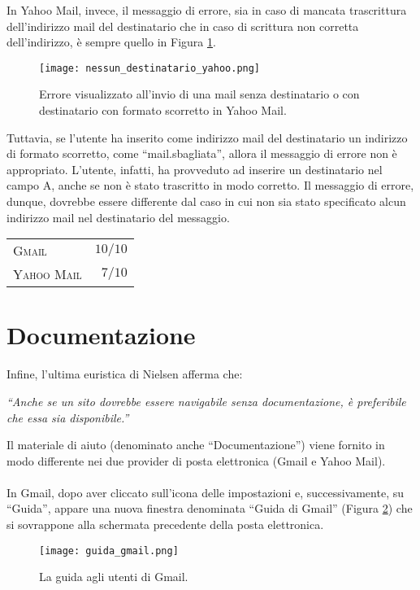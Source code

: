 		In Yahoo Mail, invece, il messaggio di errore, sia in caso di mancata trascrittura dell'indirizzo mail del destinatario che in caso di scrittura non corretta dell'indirizzo, è sempre quello in Figura \ref{fig:nessun_destinatario_yahoo}.
		\begin{figure}[h!]
			\begin{center}
				\texttt{[image: nessun\_destinatario\_yahoo.png]}
			\end{center}
			\caption[Errore di destinatario in Yahoo Mail]{Errore visualizzato all'invio di una mail senza destinatario o con destinatario con formato scorretto in Yahoo Mail.}
			\label{fig:nessun_destinatario_yahoo}
		\end{figure}
		
		Tuttavia, se l'utente ha inserito come indirizzo mail del destinatario un indirizzo di formato scorretto, come ``mail.sbagliata'', allora il messaggio di errore non è appropriato. L'utente, infatti, ha provveduto ad inserire un destinatario nel campo A, anche se non è stato trascritto in modo corretto. Il messaggio di errore, dunque, dovrebbe essere differente dal caso in cui non sia stato specificato alcun indirizzo mail nel destinatario del messaggio.
		
		\begin{flushleft}
			\begin{tabular}{lr}
				\textsc{Gmail} & $10/10$\\
				\textsc{Yahoo Mail} & $7/10$
			\end{tabular}
		\end{flushleft}
	
	\section{Documentazione} \label{sec:documentazione}
	
		Infine, l'ultima euristica di Nielsen afferma che:
		\begin{center}
			\begin{minipage}{0.7\textwidth}
				\textit{``Anche se un sito dovrebbe essere navigabile senza documentazione, è preferibile che essa sia disponibile.''}
			\end{minipage}
		\end{center}
	
		Il materiale di aiuto (denominato anche ``Documentazione'') viene fornito in modo differente nei due provider di posta elettronica (Gmail e Yahoo Mail).\\
		\\
		In Gmail, dopo aver cliccato sull'icona delle impostazioni e, successivamente, su ``Guida'', appare una nuova finestra denominata ``Guida di Gmail'' (Figura \ref{fig:guida_gmail}) che si sovrappone alla schermata precedente della posta elettronica.
		\begin{figure}[h!]
			\begin{center}
				\texttt{[image: guida\_gmail.png]}
			\end{center}
			\caption[Guida di Gmail]{La guida agli utenti di Gmail.}
			\label{fig:guida_gmail}
		\end{figure}
		
